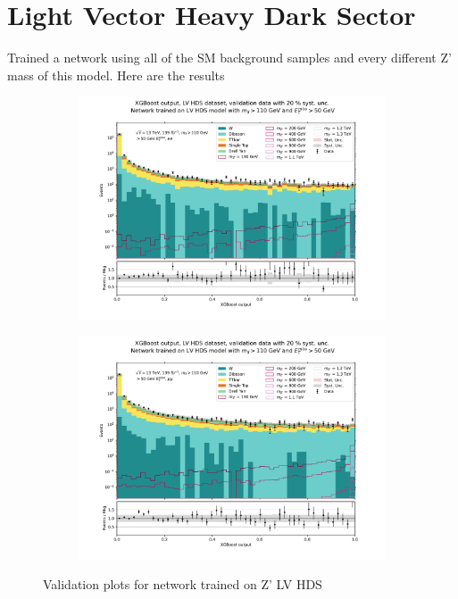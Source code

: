 \documentclass[12pt, a4paper]{book}
\begin{document}
\clearpage
\section{Light Vector Heavy Dark Sector}
Trained a network using all of the SM background samples and every different Z' mass of this model. Here are the results
\begin{figure}[!ht]
	\centering
	\begin{subfigure}[b]{0.49\textwidth}
      \centering
      \includegraphics[width=1\textwidth]{XGBoost/LV_HDS/VAL_ee.pdf}
      \end{subfigure}
   \hfill
   \begin{subfigure}[b]{0.49\textwidth}
      \centering
      \includegraphics[width=1\textwidth]{XGBoost/LV_HDS/VAL_uu.pdf}
      \end{subfigure}
   \caption{Validation plots for network trained on Z' LV HDS}\label{fig:LV_HDS_vals}
\end{figure}
\end{document}
